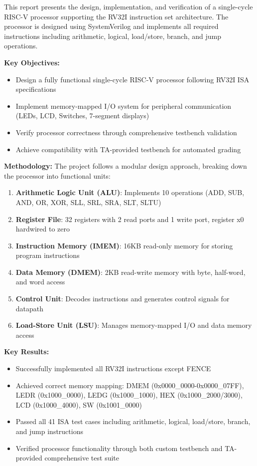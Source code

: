 This report presents the design, implementation, and verification of a single-cycle RISC-V processor supporting the RV32I instruction set architecture. The processor is designed using SystemVerilog and implements all required instructions including arithmetic, logical, load/store, branch, and jump operations.

\textbf{Key Objectives:}
\begin{itemize}
    \item Design a fully functional single-cycle RISC-V processor following RV32I ISA specifications
    \item Implement memory-mapped I/O system for peripheral communication (LEDs, LCD, Switches, 7-segment displays)
    \item Verify processor correctness through comprehensive testbench validation
    \item Achieve compatibility with TA-provided testbench for automated grading
\end{itemize}

\textbf{Methodology:}
The project follows a modular design approach, breaking down the processor into functional units:

\begin{enumerate}
    \item \textbf{Arithmetic Logic Unit (ALU)}: Implements 10 operations (ADD, SUB, AND, OR, XOR, SLL, SRL, SRA, SLT, SLTU)
    \item \textbf{Register File}: 32 registers with 2 read ports and 1 write port, register x0 hardwired to zero
    \item \textbf{Instruction Memory (IMEM)}: 16KB read-only memory for storing program instructions
    \item \textbf{Data Memory (DMEM)}: 2KB read-write memory with byte, half-word, and word access
    \item \textbf{Control Unit}: Decodes instructions and generates control signals for datapath
    \item \textbf{Load-Store Unit (LSU)}: Manages memory-mapped I/O and data memory access
\end{enumerate}

\textbf{Key Results:}
\begin{itemize}
    \item Successfully implemented all RV32I instructions except FENCE
    \item Achieved correct memory mapping: DMEM (0x0000\_0000-0x0000\_07FF), LEDR (0x1000\_0000), LEDG (0x1000\_1000), HEX (0x1000\_2000/3000), LCD (0x1000\_4000), SW (0x1001\_0000)
    \item Passed all 41 ISA test cases including arithmetic, logical, load/store, branch, and jump instructions
    \item Verified processor functionality through both custom testbench and TA-provided comprehensive test suite
\end{itemize}

